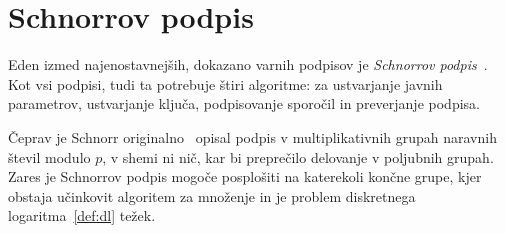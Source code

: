 \section{Schnorrov podpis}
\label{sec:schnorr}
Eden izmed najenostavnejših, dokazano varnih podpisov je \textit{Schnorrov podpis}~\cite{schnorr1989sig}.
Kot vsi podpisi, tudi ta potrebuje štiri algoritme: za ustvarjanje javnih parametrov, ustvarjanje ključa, 
podpisovanje sporočil in preverjanje podpisa.

Čeprav je Schnorr originalno~\cite{schnorr1989sig} opisal podpis v multiplikativnih grupah naravnih
števil modulo $p$, v shemi ni nič, kar bi preprečilo delovanje v poljubnih grupah. Zares
je Schnorrov podpis mogoče posplošiti na katerekoli končne grupe, kjer obstaja učinkovit algoritem
za množenje in je problem diskretnega logaritma~\ref{def:dl} težek.
